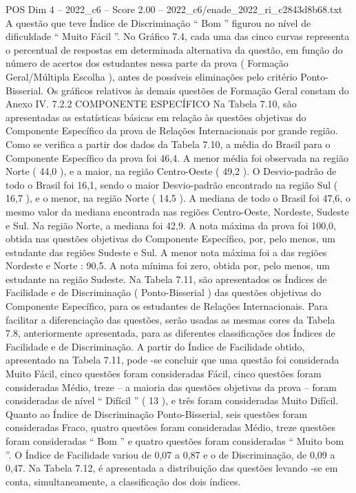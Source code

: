 \begin{textsample}{POS Dim 4 – 2022\_c6 – Score 2.00 – 2022\_c6/enade\_2022\_ri\_c2843d8b68.txt}
A questão que teve Índice de Discriminação “ Bom ” figurou no nível de dificuldade “ Muito Fácil ”.
No Gráfico 7.4, cada uma das cinco curvas representa o percentual de respostas em determinada alternativa da questão, em função do número de acertos dos estudantes nessa parte da prova ( Formação Geral/Múltipla Escolha ), antes de possíveis eliminações pelo critério Ponto-Bisserial.
Os gráficos relativos às demais questões de Formação Geral constam do Anexo IV. 7.2.2 COMPONENTE ESPECÍFICO Na Tabela 7.10, são apresentadas as estatísticas básicas em relação às questões objetivas do Componente Específico da prova de Relações Internacionais por grande região.
Como se verifica a partir dos dados da Tabela 7.10, a média do Brasil para o Componente Específico da prova foi 46,4.
A menor média foi observada na região Norte ( 44,0 ), e a maior, na região Centro-Oeste ( 49,2 ).
O Desvio-padrão de todo o Brasil foi 16,1, sendo o maior Desvio-padrão encontrado na região Sul ( 16,7 ), e o menor, na região Norte ( 14,5 ).
A mediana de todo o Brasil foi 47,6, o mesmo valor da mediana encontrada nas regiões Centro-Oeste, Nordeste, Sudeste e Sul.
Na região Norte, a mediana foi 42,9.
A nota máxima da prova foi 100,0, obtida nas questões objetivas do Componente Específico, por, pelo menos, um estudante das regiões Sudeste e Sul.
A menor nota máxima foi a das regiões Nordeste e Norte : 90,5.
A nota mínima foi zero, obtida por, pelo menos, um estudante na região Sudeste.
Na Tabela 7.11, são apresentados os Índices de Facilidade e de Discriminação ( Ponto-Bisserial ) das questões objetivas do Componente Específico, para os estudantes de Relações Internacionais.
Para facilitar a diferenciação das questões, serão usadas as mesmas cores da Tabela 7.8, anteriormente apresentada, para as diferentes classificações dos Índices de Facilidade e de Discriminação.
A partir do Índice de Facilidade obtido, apresentado na Tabela 7.11, pode -se concluir que uma questão foi considerada Muito Fácil, cinco questões foram consideradas Fácil, cinco questões foram consideradas Médio, treze – a maioria das questões objetivas da prova – foram consideradas de nível “ Difícil ” ( 13 ), e três foram consideradas Muito Difícil.
Quanto ao Índice de Discriminação Ponto-Bisserial, seis questões foram consideradas Fraco, quatro questões foram consideradas Médio, treze questões foram consideradas “ Bom ” e quatro questões foram consideradas “ Muito bom ”.
O Índice de Facilidade variou de 0,07 a 0,87 e o de Discriminação, de 0,09 a 0,47.
Na Tabela 7.12, é apresentada a distribuição das questões levando -se em conta, simultaneamente, a classificação dos dois índices.

\end{textsample}
